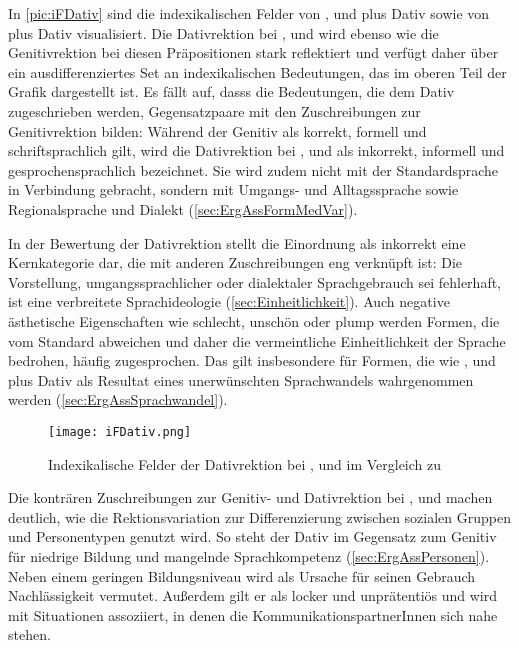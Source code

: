 In \autoref{pic:iFDativ} sind die indexikalischen Felder von \wegen, \waehrend{} und \dank{} plus Dativ sowie von \gegenueber{} plus Dativ visualisiert. 
Die Dativrektion bei \wegen, \waehrend{} und \dank{} wird ebenso wie die Genitivrektion bei diesen Präpositionen stark reflektiert und verfügt daher über ein ausdifferenziertes Set an indexikalischen Bedeutungen, das im oberen Teil der Grafik dargestellt ist. 
Es fällt auf, dasss die Bedeutungen, die dem Dativ zugeschrieben werden, Gegensatzpaare mit den Zuschreibungen zur Genitivrektion bilden:
Während der Genitiv als korrekt, formell und schriftsprachlich gilt, wird die Dativrektion bei \wegen, \waehrend{} und \dank{} als inkorrekt, informell und gesprochensprachlich bezeichnet.
Sie wird zudem nicht mit der Standardsprache in Verbindung gebracht, sondern mit Umgangs- und Alltagssprache sowie Regionalsprache und Dialekt (\autoref{sec:ErgAssFormMedVar}). 

In der Bewertung der Dativrektion stellt die Einordnung als inkorrekt eine Kernkategorie dar, die mit anderen Zuschreibungen eng verknüpft ist: 
Die Vorstellung, umgangssprachlicher oder dialektaler Sprachgebrauch sei fehlerhaft, ist eine verbreitete Sprachideologie (\autoref{sec:Einheitlichkeit}). 
Auch negative ästhetische Eigenschaften wie schlecht, unschön oder plump werden Formen, die vom Standard abweichen und daher die vermeintliche Einheitlichkeit der Sprache bedrohen, häufig zugesprochen. 
Das gilt insbesondere für Formen, die wie \wegen, \waehrend{} und \dank{} plus Dativ als Resultat eines unerwünschten Sprachwandels wahrgenommen werden (\autoref{sec:ErgAssSprachwandel}). 

\begin{figure}[hp]
\texttt{[image: iFDativ.png]}
\caption{Indexikalische Felder der Dativrektion bei \wegen, \waehrend{} und \dank{} im Vergleich zu \gegenueber}
\label{pic:iFDativ}
\end{figure}

Die konträren Zuschreibungen zur Genitiv- und Dativrektion bei \wegen, \waehrend{} und \dank{} machen deutlich, wie die Rektionsvariation zur Differenzierung zwischen sozialen Gruppen und Personentypen genutzt wird. 
So steht der Dativ im Gegensatz zum Genitiv für niedrige Bildung und mangelnde Sprachkompetenz (\autoref{sec:ErgAssPersonen}). 
Neben einem geringen Bildungsniveau wird als Ursache für seinen Gebrauch Nachlässigkeit vermutet. 
Außerdem gilt er als locker und unprätentiös und wird mit Situationen assoziiert, in denen die KommunikationspartnerInnen sich nahe stehen. 

